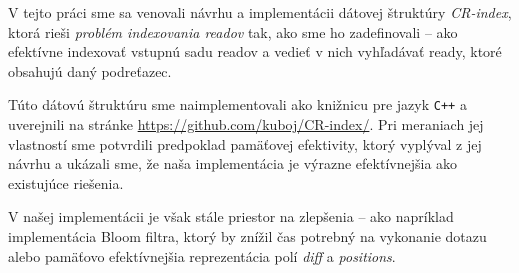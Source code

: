 V tejto práci sme sa venovali návrhu a implementácii dátovej štruktúry \emph{CR-index}, ktorá rieši \emph{problém indexovania readov} tak, ako sme ho zadefinovali -- ako efektívne indexovať vstupnú sadu readov a vedieť v nich vyhľadávať ready, ktoré obsahujú daný podreťazec.

Túto dátovú štruktúru sme naimplementovali ako knižnicu pre jazyk \texttt{C++} a uverejnili na stránke  \url{https://github.com/kuboj/CR-index/}. Pri meraniach jej vlastností sme potvrdili predpoklad pamäťovej efektivity, ktorý vyplýval z jej návrhu a ukázali sme, že naša implementácia je výrazne efektívnejšia ako existujúce riešenia.

V našej implementácii je však stále priestor na zlepšenia -- ako napríklad implementácia Bloom filtra, ktorý by znížil čas potrebný na vykonanie dotazu alebo pamäťovo efektívnejšia reprezentácia polí \emph{diff} a \emph{positions}.